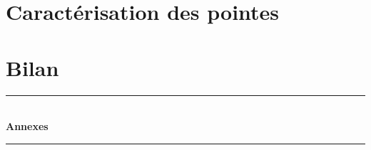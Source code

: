 \documentclass[a4paper,12pt]{report}
\begin{document}
\chapter{Caractérisation des pointes}


\chapter*{Bilan}
%





\newpage
\appendix
{}
{}

\vspace*{8cm}
\begin{center}
\rule{\linewidth}{0.5mm}\\[0.7cm]
{\huge{\bfseries Annexes}}\\[0.4cm]
\rule{\linewidth}{0.5mm}\\[0.5cm]


\end{center}
%

\newpage
%
\end{document}
